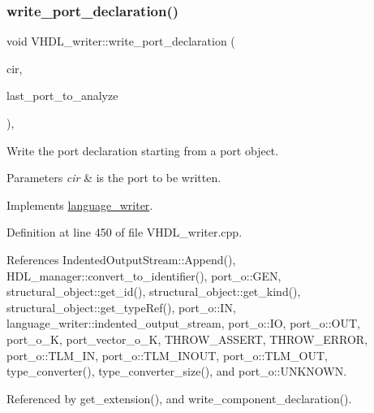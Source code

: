 \subsubsection{\texorpdfstring{write\+\_\+port\+\_\+declaration()}{write\_port\_declaration()}}
{\footnotesize\ttfamily void V\+H\+D\+L\+\_\+writer\+::write\+\_\+port\+\_\+declaration (\begin{DoxyParamCaption}\item[{const \hyperlink{structural__objects_8hpp_a8ea5f8cc50ab8f4c31e2751074ff60b2}{structural\+\_\+object\+Ref} \&}]{cir,  }\item[{bool}]{last\+\_\+port\+\_\+to\+\_\+analyze }\end{DoxyParamCaption})\hspace{0.3cm}{\ttfamily [override]}, {\ttfamily [virtual]}}



Write the port declaration starting from a port object. 


\begin{DoxyParams}{Parameters}
{\em cir} & is the port to be written. \\
\hline
\end{DoxyParams}


Implements \hyperlink{classlanguage__writer_acf6d294fc4f807691e729b0dd13bc998}{language\+\_\+writer}.



Definition at line 450 of file V\+H\+D\+L\+\_\+writer.\+cpp.



References Indented\+Output\+Stream\+::\+Append(), H\+D\+L\+\_\+manager\+::convert\+\_\+to\+\_\+identifier(), port\+\_\+o\+::\+G\+EN, structural\+\_\+object\+::get\+\_\+id(), structural\+\_\+object\+::get\+\_\+kind(), structural\+\_\+object\+::get\+\_\+type\+Ref(), port\+\_\+o\+::\+IN, language\+\_\+writer\+::indented\+\_\+output\+\_\+stream, port\+\_\+o\+::\+IO, port\+\_\+o\+::\+O\+UT, port\+\_\+o\+\_\+K, port\+\_\+vector\+\_\+o\+\_\+K, T\+H\+R\+O\+W\+\_\+\+A\+S\+S\+E\+RT, T\+H\+R\+O\+W\+\_\+\+E\+R\+R\+OR, port\+\_\+o\+::\+T\+L\+M\+\_\+\+IN, port\+\_\+o\+::\+T\+L\+M\+\_\+\+I\+N\+O\+UT, port\+\_\+o\+::\+T\+L\+M\+\_\+\+O\+UT, type\+\_\+converter(), type\+\_\+converter\+\_\+size(), and port\+\_\+o\+::\+U\+N\+K\+N\+O\+WN.



Referenced by get\+\_\+extension(), and write\+\_\+component\+\_\+declaration().

